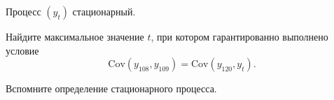 
\begin{question}
Процесс \((y_t)\) стационарный.

Найдите максимальное значение \(t\), при котором гарантированно выполнено условие
\[
 \mathrm{Cov}(y_{108}, y_{109}) = \mathrm{Cov}(y_{120}, y_t).
\]
\end{question}

\begin{solution}
Вспомните определение стационарного процесса.
\end{solution}

